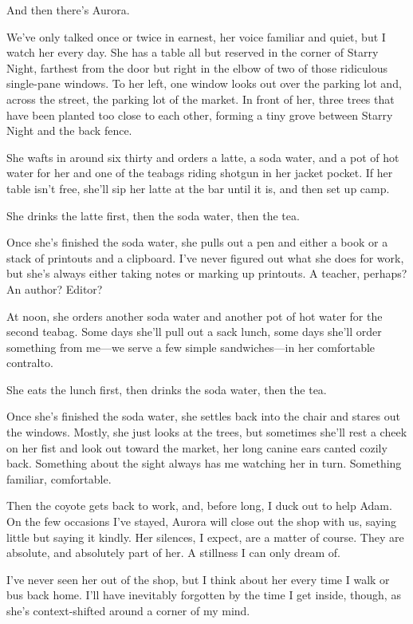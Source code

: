 And then there's Aurora.

We've only talked once or twice in earnest, her voice familiar and quiet, but I watch her every day. She has a table all but reserved in the corner of Starry Night, farthest from the door but right in the elbow of two of those ridiculous single-pane windows. To her left, one window looks out over the parking lot and, across the street, the parking lot of the market. In front of her, three trees that have been planted too close to each other, forming a tiny grove between Starry Night and the back fence.

She wafts in around six thirty and orders a latte, a soda water, and a pot of hot water for her and one of the teabags riding shotgun in her jacket pocket. If her table isn't free, she'll sip her latte at the bar until it is, and then set up camp.

She drinks the latte first, then the soda water, then the tea.

Once she's finished the soda water, she pulls out a pen and either a book or a stack of printouts and a clipboard. I've never figured out what she does for work, but she's always either taking notes or marking up printouts. A teacher, perhaps? An author? Editor?

At noon, she orders another soda water and another pot of hot water for the second teabag. Some days she'll pull out a sack lunch, some days she'll order something from me---we serve a few simple sandwiches---in her comfortable contralto.

She eats the lunch first, then drinks the soda water, then the tea.

Once she's finished the soda water, she settles back into the chair and stares out the windows. Mostly, she just looks at the trees, but sometimes she'll rest a cheek on her fist and look out toward the market, her long canine ears canted cozily back. Something about the sight always has me watching her in turn. Something familiar, comfortable.

Then the coyote gets back to work, and, before long, I duck out to help Adam. On the few occasions I've stayed, Aurora will close out the shop with us, saying little but saying it kindly. Her silences, I expect, are a matter of course. They are absolute, and absolutely part of her. A stillness I can only dream of.

I've never seen her out of the shop, but I think about her every time I walk or bus back home. I'll have inevitably forgotten by the time I get inside, though, as she's context-shifted around a corner of my mind.

